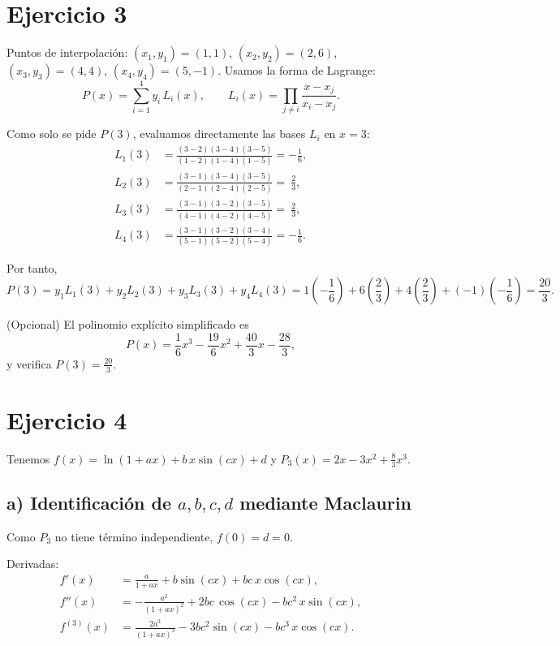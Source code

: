 \documentclass[12pt]{article}
\begin{document}
\section*{Ejercicio 3}

Puntos de interpolación: \((x_1,y_1)=(1,1)\), \((x_2,y_2)=(2,6)\), \((x_3,y_3)=(4,4)\), \((x_4,y_4)=(5,-1)\).
Usamos la forma de Lagrange:
\[
P(x)=\sum_{i=1}^{4} y_i\,L_i(x),\qquad
L_i(x)=\prod_{j\ne i}\frac{x-x_j}{x_i-x_j}.
\]

Como solo se pide \(P(3)\), evaluamos directamente las bases \(L_i\) en \(x=3\):
\[
\begin{aligned}
L_1(3) &= \frac{(3-2)(3-4)(3-5)}{(1-2)(1-4)(1-5)}= -\frac{1}{6},\\[2mm]
L_2(3) &= \frac{(3-1)(3-4)(3-5)}{(2-1)(2-4)(2-5)}= \ \frac{2}{3},\\[2mm]
L_3(3) &= \frac{(3-1)(3-2)(3-5)}{(4-1)(4-2)(4-5)}= \ \frac{2}{3},\\[2mm]
L_4(3) &= \frac{(3-1)(3-2)(3-4)}{(5-1)(5-2)(5-4)}= -\frac{1}{6}.
\end{aligned}
\]

Por tanto,
\[
\boxed{
P(3)=y_1L_1(3)+y_2L_2(3)+y_3L_3(3)+y_4L_4(3)
=1\!\left(-\frac{1}{6}\right)+6\!\left(\frac{2}{3}\right)+4\!\left(\frac{2}{3}\right)+(-1)\!\left(-\frac{1}{6}\right)
=\frac{20}{3}.
}
\]

(Opcional) El polinomio explícito simplificado es
\[
P(x)=\frac{1}{6}x^3-\frac{19}{6}x^2+\frac{40}{3}x-\frac{28}{3},
\]
y verifica \(P(3)=\frac{20}{3}\).

\section*{Ejercicio 4}

Tenemos \(f(x)=\ln(1+ax)+b\,x\sin(cx)+d\) y \(P_3(x)=2x-3x^2+\frac{8}{3}x^3\).

\subsection*{a) Identificación de \(a,b,c,d\) mediante Maclaurin}

Como \(P_3\) no tiene término independiente, \(f(0)=d=0\).

Derivadas:
\[
\begin{aligned}
f'(x) &= \frac{a}{1+ax}+b\sin(cx)+bc\,x\cos(cx),\\
f''(x) &= -\frac{a^2}{(1+ax)^2}+2bc\,\cos(cx)-bc^2\,x\sin(cx),\\
f^{(3)}(x) &= \frac{2a^3}{(1+ax)^3}-3bc^2\sin(cx)-bc^3\,x\cos(cx).
\end{aligned}
\]
\end{document}
